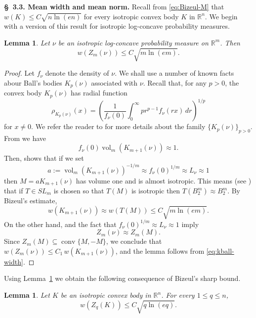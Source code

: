 \documentclass[11pt,leqno]{article}
\newtheorem{lemma}[theorem]{Lemma}
\theoremstyle{definition}
\numberwithin{equation}{section}
\newcommand{\ls}{\leqslant}
\DeclareMathOperator{\vol}{vol}
\begin{document}
\medskip 

\noindent \textbf{\S~3.3. Mean width and mean norm.} Recall from \eqref{eq:Bizeul-M} that $w(K)\ls C\sqrt{n\ln(en)}$ for every isotropic
convex body $K$ in $\mathbb{R}^n$. We begin with a version of this result for isotropic log-concave probability measures.


\begin{lemma}\label{lem:measure-bizeul}Let $\nu$ be an isotropic log-concave probability measure on $\mathbb{R}^m$. Then
\begin{equation}\label{eq:width-measure}w(Z_m(\nu))\ls C\sqrt{m\ln(em)}.\end{equation}
\end{lemma}

\begin{proof}Let $f_{\nu}$ denote the density of $\nu$. We shall use a number of known facts abour Ball's bodies $K_p(\nu)$ associated with $\nu$. 
Recall that, for any $p>0$, the convex body $K_p(\nu)$ has radial function
$$\rho_{K_p(\nu)}(x)=\left (\frac{1}{f_{\nu}(0)}\int_0^{\infty}pr^{p-1}f_{\nu}(rx)\,dr\right )^{1/p}$$ for $x\neq 0$.
We refer the reader to \cite{BGVV-book} for more details about the family $\{K_p(\nu)\}_{p>0}$. From \cite[Proposition~2.5.8]{BGVV-book} we have 
$$f_{\nu}(0) \vol_m(K_{m+1}(\nu)) \approx 1.$$
Then, \cite[Proposition~2.5.12]{BGVV-book} shows that if we set 
$$a:=\vol_m(K_{m+1}(\nu))^{-1/m}\approx f_{\nu}(0)^{1/m}\approx L_{\nu}\approx 1$$ 
then $M=aK_{m+1}(\nu)$ has volume one and is almost isotropic. 
This means (see \cite[Definition~2.5.11]{BGVV-book}) that if $T\in SL_m$ is chosen so that $T(M)$ is isotropic then $T(B_2^m)\approx B_2^m$.
By Bizeul's estimate,
\begin{equation}\label{eq:kball-width}w(K_{m+1}(\nu))\approx w(T(M))\ls C\sqrt{m\ln(em)}.\end{equation}
On the other hand, \cite[Theorem~5.1.7]{BGVV-book} and the fact that $f_{\nu}(0)^{1/m}\approx L_{\nu}\approx 1$ imply
$$Z_m(\nu)\approx Z_m(M).$$
Since $Z_m(M)\subseteq \operatorname{conv}\{M,-M\}$, we conclude that $w(Z_m(\nu))\ls C_1\,w(K_{m+1}(\nu))$, and the lemma follows from \eqref{eq:kball-width}.
\end{proof}

Using Lemma~\ref{lem:measure-bizeul} we obtain the following consequence of Bizeul's sharp bound. 

\begin{lemma}\label{lem:Zq-width}Let $K$ be an isotropic convex body in $\mathbb{R}^n$. For every $1\ls q\ls n$,
$$w(Z_q(K))\ls C\sqrt{q\ln(eq)}.$$
\end{lemma}
\end{document}
